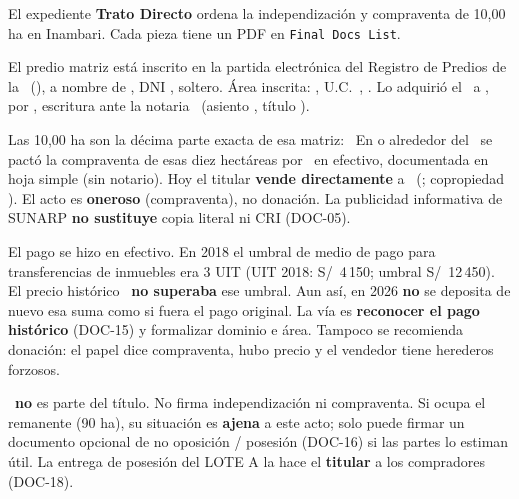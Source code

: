 \documentclass[12pt,a4paper]{article}
\begin{document}


\noindent El expediente \textbf{Trato Directo} ordena la independización y compraventa de 10,00 ha en Inambari. Cada pieza tiene un PDF en \texttt{Final Docs List}.

El predio matriz está inscrito en la partida electrónica \textbf{\PartidaMatriz} del Registro de Predios de la \OficinaRegistral\ (\ZonaRegistral), a nombre de \VendedorNombreCompleto, DNI \VendedorDNI, soltero. Área inscrita: \textbf{\AreaMatriz}, U.C.\ \UnidadCatastral, \UbicacionRegistral. Lo adquirió el \FechaAdquisicionMatriz\ a \VendedoresAnteriores, por \PrecioAdquisicionMatriz, escritura ante la notaria \NotarioAdquisicion\ (asiento \AsientoDominio, título \TituloSunarpDominio).

Las 10,00 ha son la décima parte exacta de esa matriz: \CriterioRecorte\ En o alrededor del \FechaPago\ se pactó la compraventa de esas diez hectáreas por \MontoPago\ en efectivo, documentada en hoja simple (sin notario). Hoy el titular \textbf{vende directamente} a \CompradorNombreCompleto\ (\CompradorParentesco; copropiedad \PorcentajeCopropiedad). El acto es \textbf{oneroso} (compraventa), no donación. La publicidad informativa de SUNARP \textbf{no sustituye} copia literal ni CRI (DOC-05).

El pago se hizo en efectivo. En 2018 el umbral de medio de pago para transferencias de inmuebles era 3 UIT (UIT 2018: S/\ 4\,150; umbral S/\ 12\,450). El precio histórico \MontoPago\ \textbf{no superaba} ese umbral. Aun así, en 2026 \textbf{no} se deposita de nuevo esa suma como si fuera el pago original. La vía es \textbf{reconocer el pago histórico} (DOC-15) y formalizar dominio e área. Tampoco se recomienda donación: el papel dice compraventa, hubo precio y el vendedor tiene herederos forzosos.

\IntermediarioNombre\ \textbf{no} es parte del título. No firma independización ni compraventa. Si ocupa el remanente (90 ha), su situación es \textbf{ajena} a este acto; solo puede firmar un documento opcional de no oposición / posesión (DOC-16) si las partes lo estiman útil. La entrega de posesión del LOTE A la hace el \textbf{titular} a los compradores (DOC-18).
\end{document}
